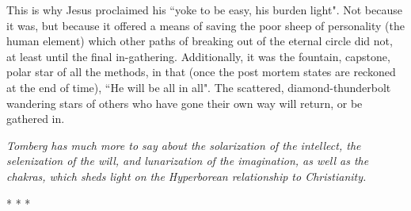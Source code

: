 This is why Jesus proclaimed his ``yoke to be easy, his burden light". Not because it was, but because it offered a means of saving the poor sheep of personality (the human element) which other paths of breaking out of the eternal circle did not, at least until the final in-gathering. Additionally, it was the fountain, capstone, polar star of all the methods, in that (once the post mortem states are reckoned at the end of time), ``He will be all in all". The scattered, diamond-thunderbolt wandering stars of others who have gone their own way will return, or be gathered in.

\emph{Tomberg has much more to say about the solarization of the intellect, the selenization of the will, and lunarization of the imagination, as well as the chakras, which sheds light on the Hyperborean relationship to Christianity. }




\begin{center}* * *\end{center}

